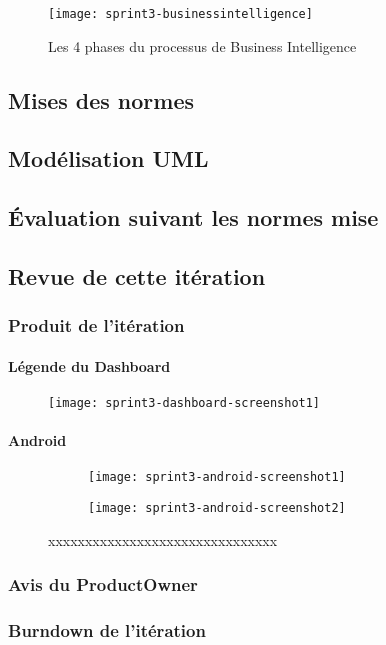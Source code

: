 \begin{figure}[htbp]
  \centering
  \texttt{[image: sprint3-businessintelligence]}
  \caption{Les 4 phases du processus de Business Intelligence}
  \label{fig:sprint3-businessintelligence}
\end{figure}
\clearpage

\subsection{Mises des normes}

\subsection{Modélisation UML}

\subsection{Évaluation suivant les normes mise}
\subsection{Revue de cette itération}
\subsubsection{Produit de l'itération}
\paragraph{Légende du Dashboard}

\begin{figure}[htbp]
  \centering
  \texttt{[image: sprint3-dashboard-screenshot1]}
  \caption{}
  \label{fig:sprint3-dashboard-screenshot1}
\end{figure}
\paragraph{Android}
\begin{figure}[htbp]
    \begin{subfigure}{.5\textwidth}
    \centering
  \centering
  \texttt{[image: sprint3-android-screenshot1]}
  \caption{}
  \label{fig:sprint3-android-screenshot1}
\end{subfigure}
\begin{subfigure}{.5\textwidth}
    \centering
  \centering
  \texttt{[image: sprint3-android-screenshot2]}
  \caption{}
  \label{fig:sprint3-android-screenshot2}
\end{subfigure}
\caption{xxxxxxxxxxxxxxxxxxxxxxxxxxxxxxx}
\end{figure}

\subsubsection{Avis du ProductOwner}

\subsubsection{Burndown de l’itération}
